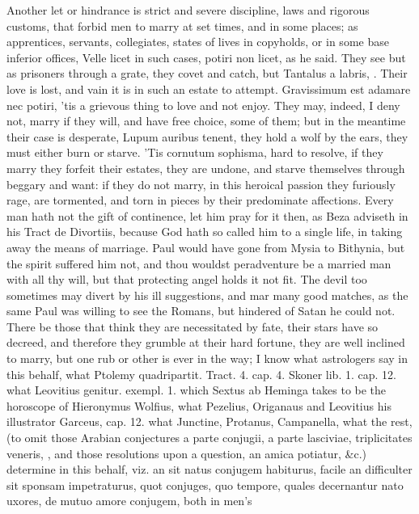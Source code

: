 Another let or hindrance is strict and severe discipline, laws and
rigorous customs, that forbid men to marry at set times, and in some
places; as apprentices, servants, collegiates, states of lives in
copyholds, or in some base inferior offices, Velle licet in such
cases, potiri non licet, as he said. They see but as prisoners through
a grate, they covet and catch, but Tantalus a labris, \etc{}. Their love is
lost, and vain it is in such an estate to attempt. Gravissimum
est adamare nec potiri, 'tis a grievous thing to love and not enjoy.
They may, indeed, I deny not, marry if they will, and have free choice,
some of them; but in the meantime their case is desperate, Lupum
auribus tenent, they hold a wolf by the ears, they must either burn or
starve. 'Tis cornutum sophisma, hard to resolve, if they marry they
forfeit their estates, they are undone, and starve themselves through
beggary and want: if they do not marry, in this heroical passion they
furiously rage, are tormented, and torn in pieces by their predominate
affections. Every man hath not the gift of continence, let him
pray for it then, as Beza adviseth in his Tract de Divortiis,
because God hath so called him to a single life, in taking away the
means of marriage. Paul would have gone from Mysia to Bithynia,
but the spirit suffered him not, and thou wouldst peradventure be a
married man with all thy will, but that protecting angel holds it not
fit. The devil too sometimes may divert by his ill suggestions, and mar
many good matches, as the same Paul was willing to see the
Romans, but hindered of Satan he could not. There be those that think
they are necessitated by fate, their stars have so decreed, and
therefore they grumble at their hard fortune, they are well inclined to
marry, but one rub or other is ever in the way; I know what astrologers
say in this behalf, what Ptolemy quadripartit. Tract. 4. cap. 4. Skoner
lib. 1. cap. 12. what Leovitius genitur. exempl. 1. which Sextus ab
Heminga takes to be the horoscope of Hieronymus Wolfius, what Pezelius,
Origanaus and Leovitius his illustrator Garceus, cap. 12. what
Junctine, Protanus, Campanella, what the rest, (to omit those Arabian
conjectures a parte conjugii, a parte lasciviae, triplicitates veneris,
\etc{}, and those resolutions upon a question, an amica potiatur, \&c.)
determine in this behalf, viz. an sit natus conjugem habiturus, facile
an difficulter sit sponsam impetraturus, quot conjuges, quo tempore,
quales decernantur nato uxores, de mutuo amore conjugem, both in men's
